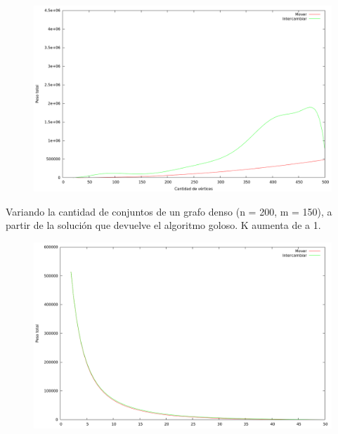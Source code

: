 \begin{figure}[h]
  \begin{center}
    \includegraphics[scale=0.35]{imagenes/local-random-n-peso.png}
  \end{center}
\end{figure}

\vspace*{0.5cm}

Variando la cantidad de conjuntos de un grafo denso (n = 200, m = 150), a partir
de la solución que devuelve el algoritmo goloso. K aumenta de a 1.
\vspace*{0.5cm}

\begin{figure}[h]
  \begin{center}
    \includegraphics[scale=0.35]{imagenes/local-goloso-k-peso.png}
  \end{center}
\end{figure}

\vspace*{0.5cm}

